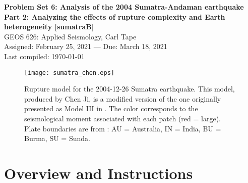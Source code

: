 \documentclass[11pt,titlepage,fleqn]{article}
\begin{document}

\begin{spacing}{1.2} 
\centering
{\large \bf Problem Set 6: Analysis of the 2004 Sumatra-Andaman earthquake \\
Part 2: Analyzing the effects of rupture complexity and Earth heterogeneity [sumatraB]} \\
GEOS 626: Applied Seismology, Carl Tape \\
Assigned: February 25, 2021 --- Due: March 18, 2021 \\
Last compiled: \today
\end{spacing}


\begin{figure}[h]
\centering
\texttt{[image: sumatra\_chen.eps]}
\caption[]
{{
Rupture model for the 2004-12-26  Sumatra earthquake.
This model, produced by Chen Ji, is a modified version of the one originally presented as Model III in \citet[][Figure~5c]{Ammon2005}.
The color corresponds to the seismological moment associated with each patch (red = large).
Plate boundaries are from \citet{Bird2003}: AU = Australia, IN = India, BU = Burma, SU = Sunda.
}}
\label{fig:sumatra_chen}
\end{figure}


\clearpage\pagebreak
\section*{Overview and Instructions}
\end{document}
